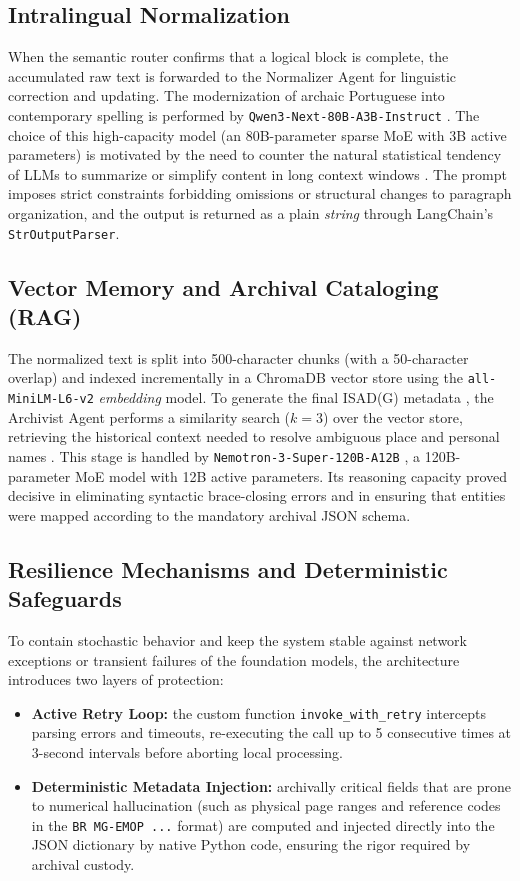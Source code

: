 \documentclass[conference]{IEEEtran}
\begin{document}
\subsection{Intralingual Normalization}

When the semantic router confirms that a logical block is complete, the accumulated raw text is forwarded to the Normalizer Agent for linguistic correction and updating. The modernization of archaic Portuguese into contemporary spelling is performed by \texttt{Qwen3-Next-80B-A3B-Instruct} \cite{qwen3_next}. The choice of this high-capacity model (an 80B-parameter sparse MoE with 3B active parameters) is motivated by the need to counter the natural statistical tendency of LLMs to summarize or simplify content in long context windows \cite{traducaointralingual}. The prompt imposes strict constraints forbidding omissions or structural changes to paragraph organization, and the output is returned as a plain \textit{string} through LangChain's \texttt{StrOutputParser}.

\subsection{Vector Memory and Archival Cataloging (RAG)}

The normalized text is split into 500-character chunks (with a 50-character overlap) and indexed incrementally in a ChromaDB vector store using the \texttt{all-MiniLM-L6-v2} \textit{embedding} model. To generate the final ISAD(G) metadata \cite{isad_g_2001}, the Archivist Agent performs a similarity search ($k=3$) over the vector store, retrieving the historical context needed to resolve ambiguous place and personal names \cite{rag}. This stage is handled by \texttt{Nemotron-3-Super-120B-A12B} \cite{nemotron3_super}, a 120B-parameter MoE model with 12B active parameters. Its reasoning capacity proved decisive in eliminating syntactic brace-closing errors and in ensuring that entities were mapped according to the mandatory archival JSON schema.

\subsection{Resilience Mechanisms and Deterministic Safeguards}

To contain stochastic behavior and keep the system stable against network exceptions or transient failures of the foundation models, the architecture introduces two layers of protection:
\begin{itemize}
    \item \textbf{Active Retry Loop:} the custom function \texttt{invoke\_with\_retry} intercepts parsing errors and timeouts, re-executing the call up to 5 consecutive times at 3-second intervals before aborting local processing.
    \item \textbf{Deterministic Metadata Injection:} archivally critical fields that are prone to numerical hallucination (such as physical page ranges and reference codes in the \texttt{BR MG-EMOP ...} format) are computed and injected directly into the JSON dictionary by native Python code, ensuring the rigor required by archival custody.
\end{itemize}
\end{document}
